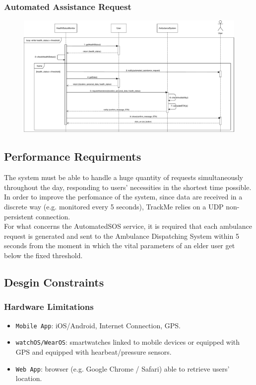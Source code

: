 \documentclass[12pt,a4paper]{article}
\begin{document}
		\subsubsection{Automated Assistance Request}
		\begin{figure}[H]
			\centering
			\includegraphics[width=1.2\linewidth]{Images/automated_request_sequence}
			\label{fig:automated_request_sequence}
		\end{figure}

	\subsection{Performance Requirments}
	The system must be able to handle a huge quantity of requests simultaneously throughout the day, responding to users' necessities in the shortest time possible. In order to improve the perfomance of the system, since data are received in a discrete way (e.g. monitored every 5 seconds), TrackMe relies on a UDP non-persistent connection.\\
	For what concerns the AutomatedSOS service, it is required that each ambulance request is generated and sent to the Ambulance Dispatching System within 5 seconds from the moment in which the vital parameters of an elder user get below the fixed threshold.

	\subsection{Desgin Constraints}
	\subsubsection{Hardware Limitations}
		\begin{itemize}
			\item \texttt{Mobile App}: iOS/Android, Internet Connection, GPS.
			\item \texttt{watchOS/WearOS}: smartwatches linked to mobile devices or equipped with GPS and equipped with hearbeat/pressure sensors.
			\item \texttt{Web App}: browser (e.g. Google Chrome / Safari) able to retrieve users' location.
		\end{itemize}
	
\end{document}
